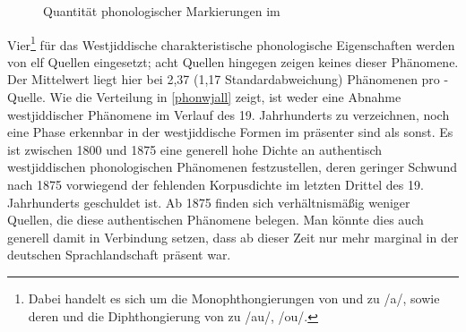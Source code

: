 \begin{figure}[h!]
	\caption{Quantität phonologischer Markierungen im }
	\label{phonall}	
\end{figure}
\FloatBarrier
 
 
 Vier\footnote{Dabei handelt es sich um die Monophthongierungen von  und  zu /a\textlengthmark/, sowie deren  und die Diphthongierung von  zu /au/, /ou/.} für das Westjiddische charakteristische phonologische Eigenschaften werden von elf Quellen eingesetzt; acht Quellen hingegen zeigen keines dieser Phänomene. Der Mittelwert liegt hier bei 2,37 (1,17 Standardabweichung) Phänomenen pro -Quelle. Wie die Verteilung in \ref{phonwjall} zeigt, ist weder eine Abnahme westjiddischer Phänomene im Verlauf des 19. Jahrhunderts zu verzeichnen, noch eine Phase erkennbar in der westjiddische Formen im  präsenter sind als sonst. Es ist zwischen 1800 und 1875 eine generell hohe Dichte an authentisch westjiddischen phonologischen Phänomenen festzustellen, deren geringer Schwund nach 1875 vorwiegend der fehlenden Korpusdichte im letzten Drittel des 19. Jahrhunderts geschuldet ist. Ab 1875 finden sich verhältnismäßig weniger Quellen, die diese authentischen Phänomene belegen. Man könnte dies auch generell damit in Verbindung setzen, dass ab dieser Zeit  nur mehr marginal in der deutschen Sprachlandschaft präsent war.\\  
 
